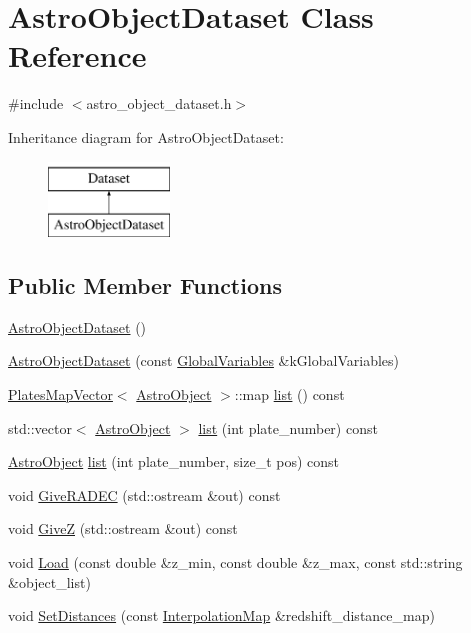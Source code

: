 \hypertarget{class_astro_object_dataset}{\section{Astro\-Object\-Dataset Class Reference}
\label{class_astro_object_dataset}
}


{\ttfamily \#include $<$astro\-\_\-object\-\_\-dataset.\-h$>$}

Inheritance diagram for Astro\-Object\-Dataset\-:\begin{figure}[H]
\begin{center}
\leavevmode
\includegraphics[height=2.000000cm]{class_astro_object_dataset}
\end{center}
\end{figure}
\subsection*{Public Member Functions}
\begin{DoxyCompactItemize}
\item 
\hyperlink{class_astro_object_dataset_aa75a72ea1b6dc3d9809cfac1b6c99f0a}{Astro\-Object\-Dataset} ()
\item 
\hyperlink{class_astro_object_dataset_a6962f42add89f7350a962324ac59ed89}{Astro\-Object\-Dataset} (const \hyperlink{class_global_variables}{Global\-Variables} \&k\-Global\-Variables)
\item 
\hyperlink{struct_plates_map_vector}{Plates\-Map\-Vector}$<$ \hyperlink{class_astro_object}{Astro\-Object} $>$\-::map \hyperlink{class_astro_object_dataset_a02751cdfdbd16f9d3a4d10a4f7e5173b}{list} () const 
\item 
std\-::vector$<$ \hyperlink{class_astro_object}{Astro\-Object} $>$ \hyperlink{class_astro_object_dataset_a87661176688f8709b08d5b950ed3d200}{list} (int plate\-\_\-number) const 
\item 
\hyperlink{class_astro_object}{Astro\-Object} \hyperlink{class_astro_object_dataset_a02d9f63962fefac8c89d29d9932c5e2b}{list} (int plate\-\_\-number, size\-\_\-t pos) const 
\item 
void \hyperlink{class_astro_object_dataset_a6dbee08285bbd1fba5b900e637ce5b2d}{Give\-R\-A\-D\-E\-C} (std\-::ostream \&out) const 
\item 
void \hyperlink{class_astro_object_dataset_a98c5a1ebf074c2589ed1e924bf5899bc}{Give\-Z} (std\-::ostream \&out) const 
\item 
void \hyperlink{class_astro_object_dataset_a7769e025efd79c249abcfc67bd653673}{Load} (const double \&z\-\_\-min, const double \&z\-\_\-max, const std\-::string \&object\-\_\-list)
\item 
void \hyperlink{class_astro_object_dataset_a4fe526d8aaf1f7e0182d5f30f82dcc60}{Set\-Distances} (const \hyperlink{class_interpolation_map}{Interpolation\-Map} \&redshift\-\_\-distance\-\_\-map)
\end{DoxyCompactItemize}


